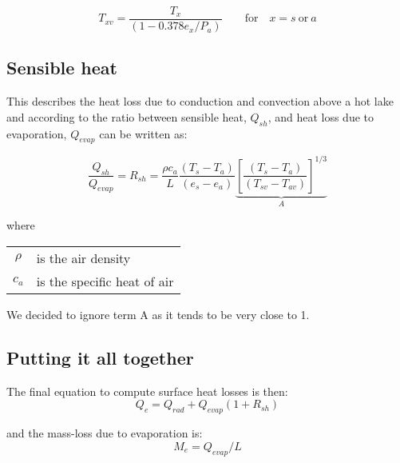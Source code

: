 \documentclass{bmc_template/bmcart}
\begin{document}
\begin{equation}\label{vtemp}
T_{xv} = \frac{T_x}{(1-0.378e_x/P_a)} \qquad \mathrm{for}\quad x = s\ \mathrm{or}\ a
\end{equation}

\subsection{Sensible heat}
This describes the heat loss due to conduction and convection above a hot lake
and according to \cite{Stevenson1992} the ratio between sensible heat,
$Q_{sh}$, and heat loss due to evaporation, $Q_{evap}$ can be written as:

\begin{equation}
    \frac{Q_{sh}}{Q_{evap}}=R_{sh}=\frac{\rho c_a}{L} \frac{(T_s - T_a)}{(e_s - e_a)}
    \underbrace{\left [ \frac{(T_s-T_a)}{(T_{sv} - T_{av})} \right ]^{1/3}}_A 
\end{equation}

where

\begin{table}[h!]
\begin{tabular}{cp{8cm}}
    $\rho$ & is the air density \\
    $c_a$ & is the specific heat of air\\
\end{tabular}
\end{table}

We decided to ignore term A as it tends to be very close to 1.

\subsection{Putting it all together}
The final equation to compute surface heat losses is then:
\begin{equation}
    Q_e = Q_{rad} + Q_{evap}(1+R_{sh})
\end{equation}

and the mass-loss due to evaporation is:
\begin{equation}
    M_e = Q_{evap}/L
\end{equation}





\end{document}
